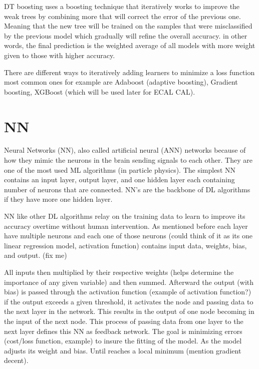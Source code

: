 DT boosting uses a boosting technique that iteratively works to improve the weak trees by combining more that will correct the error of the previous one.
Meaning that the new tree will be trained on the samples that were misclassified by the previous model which gradually will refine the overall accuracy.
in other words, the final prediction is the weighted average of all models with more weight given to those with higher accuracy.

There are different ways to iteratively adding learners to minimize a loss function most common ones for example are Adaboost (adaptive boosting), Gradient boosting, XGBoost (which will be used later for ECAL CAL).

\section{NN}
Neural Networks (NN), also called artificial neural (ANN) networks because of how they mimic the neurons in the brain sending signals to each other. 
They are one of the most used ML algorithms (in particle physics). 
The simplest NN contains an input layer, output layer, and one hidden layer each containing number of neurons that are connected. NN’s are the backbone of DL algorithms if they have more one hidden layer. %

NN like other DL algorithms relay on the training data to learn to improve its accuracy overtime without human intervention. As mentioned before each layer have multiple neurons and each one of those neurons (could think of it as its one linear regression model, activation function) contains input data, weights, bias, and output. (fix me)

All inputs then multiplied by their respective weights (helps determine the importance of any given variable) and then summed. Afterward the output (with bias) is passed through the activation function (example of activation function?) if the output exceeds a given threshold, it activates the node and passing data to the next layer in the network. This results in the output of one node becoming in the input of the next node. This process of passing data from one layer to the next layer defines this NN as feedback network. The goal is minimizing errors (cost/loss function, example) to insure the fitting of the model. As the model adjusts its weight and bias. Until reaches a local minimum (mention gradient decent).










